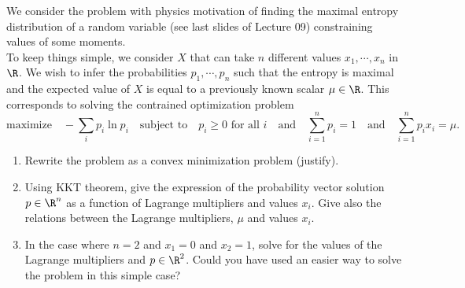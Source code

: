 \documentclass[11pt,nocut]{article}
\begin{document}
\vspace{5mm}

\begin{problem}[$\star$]
	We consider the problem with physics motivation of finding the maximal entropy distribution of a random variable (see last slides of Lecture 09)  constraining values of some moments. \\
	

	To keep things simple, we consider $X$ that can take $n$ different values $x_1, \cdots, x_n$ in $\R$. We wish to infer the probabilities $p_1, \cdots, p_n$ such that the entropy is maximal and the expected value of $X$ is equal to a previously known scalar $\mu \in \R$. This corresponds to solving the contrained optimization problem
	\begin{equation}\label{eq:eig3}
		\text{maximize} \quad - \sum_i p_i \ln p_i \quad \text{subject to} \quad p_i \geq 0 \text{ for all } i
		\quad \text{and} \quad \sum_{i=1}^n p_i = 1
		\quad \text{and} \quad \sum_{i=1}^n p_i x_i = \mu.
	\end{equation}
	\begin{enumerate}[label=\normalfont(\textbf{\alph*})]
		\item Rewrite the problem as a convex minimization problem (justify).
		\item Using KKT theorem, give the expression of the probability vector solution $p \in \R^n$ as a function of Lagrange multipliers and values $x_i$. Give also the relations between the Lagrange multipliers, $\mu$ and values $x_i$.
		\item In the case where $n=2$ and $x_1=0$ and $x_2=1$, solve for the values of the Lagrange multipliers and $p \in \R^2$. Could you have used an easier way to solve the problem in this simple case?

	\end{enumerate}

\end{problem}



%
%
\end{document}
